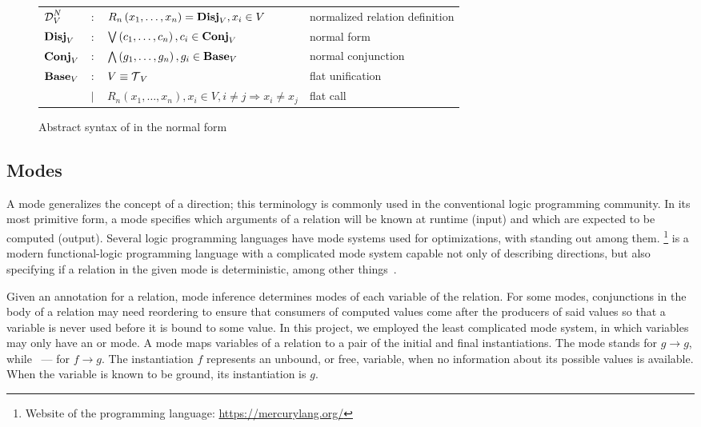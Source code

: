 \begin{figure}[h]
    \begin{tabular}{llll}
     $\operatorname{\mathcal{D}}_{V}^N$ & $:$ & $R_{n}\left( x_1, \ldots, x_{n} \right) = \operatorname{\mathbf{Disj}}_{V}, x_{i}\in V$ & normalized relation definition \\
    $\operatorname{\mathbf{Disj}}_{V}$ & $:$ & $\bigvee\left( c_1, \ldots, c_{n} \right), c_{i}\in \operatorname{\mathbf{Conj}}_{V}$ & normal form \\
    $\operatorname{\mathbf{Conj}}_{V}$ & $:$ & $\bigwedge\left( g_1, \ldots, g_n \right), g_{i}\in \operatorname{\mathbf{Base}}_{V}$ & normal conjunction \\
    $\operatorname{\mathbf{Base}}_{V}$ & $:$ & $V \equiv \operatorname{\mathcal{T}}_{V}$ & flat unification \\
                & $\mid$ & $R_{n}\left( x_1, \ldots, x_{n} \right), x_{i}\in V, i \neq j \Rightarrow x_i \neq x_j$ & flat call\\

    \end{tabular}
    \caption{Abstract syntax of \micro in the normal form}
    \label{fig:miniKanren}
\end{figure}

\subsection{Modes}

A mode generalizes the concept of a direction; this terminology is commonly used in the conventional logic programming community.
In its most primitive form, a mode specifies which arguments of a relation will be known at runtime (input) and which are expected to be computed (output).
Several logic programming languages have mode systems used for optimizations, with \merc standing out among them.
\merc\footnote{Website of the \merc programming language: \url{https://mercurylang.org/}} is a modern functional-logic programming language with a complicated mode system capable not only of describing directions, but also specifying if a relation in the given mode is deterministic, among other things~\cite{overton2002constraint}.

Given an annotation for a relation, mode inference determines modes of each variable of the relation.
For some modes, conjunctions in the body of a relation may need reordering to ensure that consumers of computed values come after the producers of said values so that a variable is never used before it is bound to some value.
In this project, we employed the least complicated mode system, in which variables may only have an \inm or \outm mode.
A mode maps variables of a relation to a pair of the initial and final instantiations.
The mode \inm stands for $g \rightarrow g$, while \outm~--- for $f \rightarrow g$.
The instantiation $f$ represents an unbound, or free, variable, when no information about its possible values is available.
When the variable is known to be ground, its instantiation is $g$.

